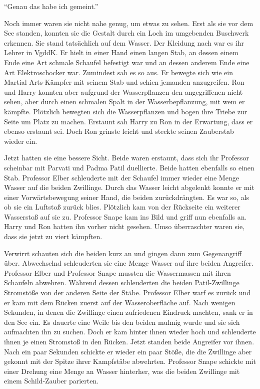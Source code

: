 \enquote{Genau das habe ich gemeint.}

Noch immer waren sie nicht nahe genug, um etwas zu sehen. Erst als sie vor dem See standen, konnten sie die Gestalt durch ein Loch im umgebenden Buschwerk erkennen. Sie stand tatsächlich auf dem Wasser. Der Kleidung nach war es ihr Lehrer in VgddK. Er hielt in einer Hand einen langen Stab, an dessen einem Ende eine Art schmale Schaufel befestigt war und an dessen anderem Ende eine Art Elektroschocker war. Zumindest sah es so aus. Er bewegte sich wie ein Martial Arts-Kämpfer mit seinem Stab und schien jemanden anzugreifen. Ron und Harry konnten aber aufgrund der Wasserpflanzen den angegriffenen nicht sehen, aber durch einen schmalen Spalt in der Wasserbepflanzung, mit wem er kämpfte. Plötzlich bewegten sich die Wasserpflanzen und bogen ihre Triebe zur Seite um Platz zu machen. Erstaunt sah Harry zu Ron in der Erwartung, dass er ebenso erstaunt sei. Doch Ron grinste leicht und steckte seinen Zauberstab wieder ein.

Jetzt hatten sie eine bessere Sicht. Beide waren erstaunt, dass sich ihr Professor scheinbar mit Parvati und Padma Patil duellierte. Beide hatten ebenfalls so einen Stab. Professor Elber schleuderte mit der Schaufel immer wieder eine Menge Wasser auf die beiden Zwillinge. Durch das Wasser leicht abgelenkt konnte er mit einer Vorwärtsbewegung seiner Hand, die beiden zurückdrängten. Es war so, als ob sie ein Luftstoß zurück blies. Plötzlich kam von der Rückseite ein weiterer Wasserstoß auf sie zu. Professor Snape kam ins Bild und griff nun ebenfalls an. Harry und Ron hatten ihn vorher nicht gesehen. Umso überraschter waren sie, dass sie jetzt zu viert kämpften.

Verwirrt schauten sich die beiden kurz an und gingen dann zum Gegenangriff über. Abwechselnd schleuderten sie eine Menge Wasser auf ihre beiden Angreifer. Professor Elber und Professor Snape mussten die Wassermassen mit ihren Schaufeln abwehren. Während dessen schleuderten die beiden Patil-Zwillinge Stromstöße von der anderen Seite der Stäbe. Professor Elber warf es zurück und er kam mit dem Rücken zuerst auf der Wasseroberfläche auf. Nach wenigen Sekunden, in denen die Zwillinge einen zufriedenen Eindruck machten, sank er in den See ein. Es dauerte eine Weile bis den beiden mulmig wurde und sie sich aufmachten ihn zu suchen. Doch er kam hinter ihnen wieder hoch und schleuderte ihnen je einen Stromstoß in den Rücken. Jetzt standen beide Angreifer vor ihnen. Nach ein paar Sekunden schickte er wieder ein paar Stöße, die die Zwillinge aber gekonnt mit der Spitze ihrer Kampfstäbe abwehrten. Professor Snape schickte mit einer Drehung eine Menge an Wasser hinterher, was die beiden Zwillinge mit einem Schild-Zauber parierten.

